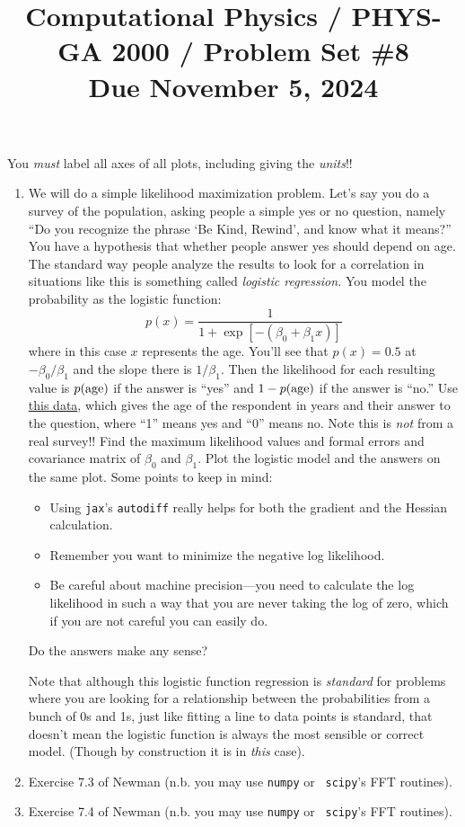 \documentclass[11pt, preprint]{aastex}
\begin{document}
\title{\bf Computational Physics / PHYS-GA 2000 / Problem Set \#8
\\ Due November 5, 2024 }

You {\it must} label all axes of all plots, including giving the {\it
  units}!!

\begin{enumerate} 
\item We will do a simple likelihood maximization problem. Let's say
  you do a survey of the population, asking people a simple yes or no
  question, namely ``Do you recognize the phrase `Be Kind, Rewind',
  and know what it means?'' You have a hypothesis that whether people
  answer yes should depend on age. The standard way people analyze the
  results to look for a correlation in situations like this is
  something called {\it logistic regression.} You model the
  probability as the logistic function:
  \begin{equation}
    p(x) = \frac{1}{1+ \exp\left[-(\beta_0 + \beta_1 x)\right]}
  \end{equation}
  where in this case $x$ represents the age.  You'll see that
  $p(x)=0.5$ at $-\beta_0/\beta_1$ and the slope there is $1/\beta_1$.
  Then the likelihood for each resulting value is $p({\rm age})$ if
  the answer is ``yes'' and $1 - p({\rm age})$ if the answer is
  ``no.''  Use
  \href{https://github.com/blanton144/computational-grad/blob/main/data/survey.csv}{this
    data}, which gives the age of the respondent in years and their
  answer to the question, where ``1'' means yes and ``0'' means
  no. Note this is {\it not} from a real survey!!  Find the maximum
  likelihood values and formal errors and covariance matrix of
  $\beta_0$ and $\beta_1$. Plot the logistic model and the answers on
  the same plot. Some points to keep in mind:
  \begin{itemize}
    \item Using {\tt jax}'s {\tt autodiff} really helps for both the
      gradient and the Hessian calculation. 
    \item Remember you want to minimize the negative log likelihood.
    \item Be careful about machine precision---you need to calculate
      the log likelihood in such a way that you are never taking the
      log of zero, which if you are not careful you can easily do.
  \end{itemize}
  Do the answers make any sense?

  Note that although this logistic function regression is {\it
    standard} for problems where you are looking for a relationship
  between the probabilities from a bunch of 0s and 1s, just like
  fitting a line to data points is standard, that doesn't mean the
  logistic function is always the most sensible or correct model.
  (Though by construction it is in {\it this} case).
\item Exercise 7.3 of Newman (n.b. you may use {\tt numpy} or {\tt
  scipy}'s FFT routines).
\item Exercise 7.4 of Newman (n.b. you may use {\tt numpy} or {\tt
  scipy}'s FFT routines).
\end{enumerate} 
\end{document}
